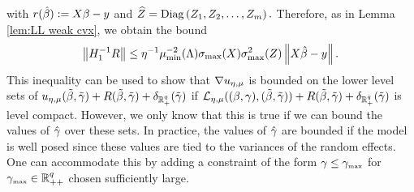 with $r(\hat{\beta}):=X\beta-y$ and 
\(
{\widehat Z}=\mathrm{Diag}\left(Z_1,Z_2,\dots,Z_m\right).
\)
Therefore, as in Lemma \ref{lem:LL weak cvx}, we obtain the bound
\begin{equation}\label{eq:S lip bd 2}
\left\Vert H_1^{-1}R\right\Vert\le \eta^{-1}\mu^{-2}_{\text{min}}(\Lambda)          
\sigma_{\text{max}}(X)\sigma_{\text{max}}^2(Z)\left\Vert X\hat{\beta} -y\right\Vert.
\end{equation}
This inequality can be used to show that $\nabla {u_{\eta,\mu}}$ is bounded on the lower
level sets of ${u_{\eta,\mu}}(\tilde\beta,{\tilde{\gamma}}) + R(\tilde\beta,{\tilde{\gamma}})+\delta_{\operatorname{\mathbb{R}}^q_+}({\tilde{\gamma}})$ if
$\operatorname{\mathcal{L}}_{{\eta,\mu}}((\beta,\gamma),(\tilde\beta,{\tilde{\gamma}})) + R(\tilde\beta,{\tilde{\gamma}})+\delta_{\operatorname{\mathbb{R}}^q_+}({\tilde{\gamma}})$ is level
compact. However, we only know that this is true if we can bound the values 
of ${\hat{\gamma}}$ over these sets. In practice, the values of ${\hat{\gamma}}$ are bounded if the
model is well posed since these values are tied to the variances of
the random effects. One can accommodate this by adding a constraint of the 
form $\gamma\le{\gamma_{\mbox{\tiny max}}}$ for ${\gamma_{\mbox{\tiny max}}}\in\operatorname{\mathbb{R}}^q_{++}$ chosen sufficiently large.


